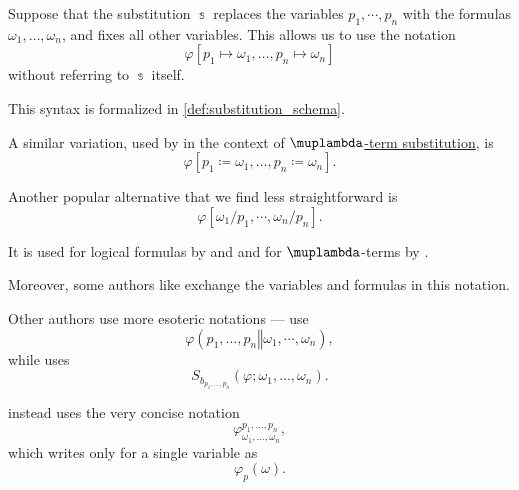 \begin{remark}\label{rem:substitution_notation}
  Suppose that the substitution \( \Bbbs \) replaces the variables \( p_1, \cdots, p_n \) with the formulas \( \omega_1, \ldots, \omega_n \), and fixes all other variables. This allows us to use the notation
  \begin{equation*}
    \varphi[p_1 \mapsto \omega_1, \ldots, p_n \mapsto \omega_n]
  \end{equation*}
  without referring to \( \Bbbs \) itself.

  This syntax is formalized in \cref{def:substitution_schema}.

  A similar variation, used by \textcite[def. 2.1.15]{Barendregt1984LambdaCalculus} in the context of \hyperref[def:atomic_lambda_term_substitution]{\( \muplambda \)-term substitution}, is
  \begin{equation*}
    \varphi[p_1 \coloneqq \omega_1, \ldots, p_n \coloneqq \omega_n].
  \end{equation*}

  Another popular alternative that we find less straightforward is
  \begin{equation*}
    \varphi[\omega_1 / p_1, \cdots, \omega_n / p_n].
  \end{equation*}

  It is used for logical formulas by \textcite[19]{VanDalen2004LogicAndStructure} and \textcite[\S 3.1.4]{Mimram2020ProgramEqualsProof} and for \( \muplambda \)-terms by \textcite[def. 1A7]{Hindley1997BasicSTT}.

  Moreover, some authors like \textcite[4]{TroelstraSchwichtenberg2000BasicProofTheory} exchange the variables and formulas in this notation.

  Other authors use more esoteric notations --- \textcite[47]{КолмогоровДрагалин2006ЛогикаВведение} use
  \begin{equation*}
    \varphi(p_1, \ldots, p_n \mathrel{\Vert} \omega_1, \cdots, \omega_n),
  \end{equation*}
  while \textcite[131]{Эдельман1975Логика} uses
  \begin{equation*}
    S_{b_{p_1, \ldots, p_n}}(\varphi; \omega_1, \ldots, \omega_n).
  \end{equation*}

  \textcite[16]{Andrews2002Logic} instead uses the very concise notation
  \begin{equation*}
    \varphi^{p_1, \ldots, p_n}_{\omega_1, \ldots, \omega_n},
  \end{equation*}
  which \textcite[def. 2.2.19]{Hinman2005Logic} writes only for a single variable as
  \begin{equation*}
    \varphi_p(\omega).
  \end{equation*}
\end{remark}

